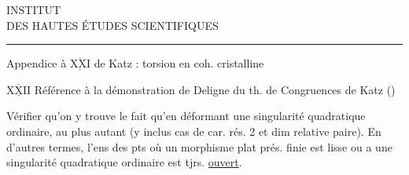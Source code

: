 \begin{center}
INSTITUT\\
DES HAUTES ÉTUDES SCIENTIFIQUES\\[-.3ex]
\rule{1.3cm}{.4pt}
\end{center}

Appendice à $\underline{\overline{\mathrm{XXI}}}$ de Katz : torsion en coh. cristalline

$\underline{\overline{\mathrm{XXII}}}$ \quad Référence à la démonstration de Deligne du th. de Congruences de Katz ()

{\reversemarginpar{}}Vérifier qu'on y trouve le fait qu'en déformant une singularité quadratique ordinaire,   au plus autant (y inclus cas de car. rés. 2 et dim relative paire). En d'autres termes, l'ens des pts où un morphisme plat  prés. finie est lisse ou a une singularité quadratique ordinaire est tjrs. \uline{ouvert}.
